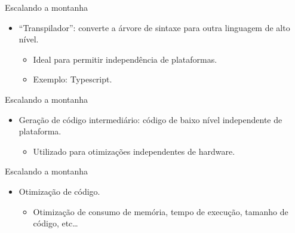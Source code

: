 \begin{frame}{Escalando a montanha}

    \begin{itemize}

        \item
        ``Transpilador'': converte a árvore de sintaxe para outra linguagem de
        alto nível.

        \begin{itemize}

            \item
            Ideal para permitir independência de plataformas.
            \item
            Exemplo: Typescript.
        \end{itemize}
    \end{itemize}
\end{frame}

\begin{frame}{Escalando a montanha}

    \begin{itemize}

        \item
        Geração de código intermediário: código de baixo nível independente de
        plataforma.

        \begin{itemize}

            \item
            Utilizado para otimizações independentes de hardware.
        \end{itemize}
    \end{itemize}
\end{frame}

\begin{frame}{Escalando a montanha}

    \begin{itemize}

        \item
        Otimização de código.

        \begin{itemize}

            \item
            Otimização de consumo de memória, tempo de execução, tamanho de
            código, etc\ldots{}
        \end{itemize}
    \end{itemize}
\end{frame}

